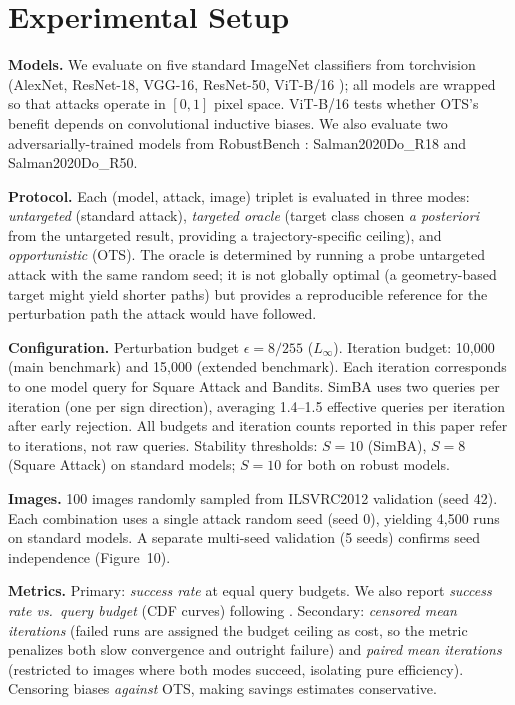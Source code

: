 \documentclass{cap2026}
\begin{document}
\section{Experimental Setup}\label{sec:setup}

\hspace{\parindent}\textbf{Models.} We evaluate on five standard ImageNet classifiers from torchvision (AlexNet, ResNet-18, VGG-16, ResNet-50, ViT-B/16 \citep{dosovitskiy2021image}); all models are wrapped so that attacks operate in $[0, 1]$ pixel space. ViT-B/16 tests whether OTS's benefit depends on convolutional inductive biases. We also evaluate two adversarially-trained models from RobustBench \citep{salman2020adversarially,croce2021robustbench}: Salman2020Do\_R18 and Salman2020Do\_R50.

\textbf{Protocol.} Each (model, attack, image) triplet is evaluated in three modes: \textit{untargeted} (standard attack), \textit{targeted oracle} (target class chosen \textit{a posteriori} from the untargeted result, providing a trajectory-specific ceiling), and \textit{opportunistic} (OTS). The oracle is determined by running a probe untargeted attack with the same random seed; it is not globally optimal (a geometry-based target might yield shorter paths) but provides a reproducible reference for the perturbation path the attack would have followed.

\textbf{Configuration.} Perturbation budget $\epsilon = 8/255$ ($L_\infty$). Iteration budget: 10,000 (main benchmark) and 15,000 (extended benchmark). Each iteration corresponds to one model query for Square Attack and Bandits. SimBA uses two queries per iteration (one per sign direction), averaging 1.4--1.5 effective queries per iteration after early rejection. All budgets and iteration counts reported in this paper refer to iterations, not raw queries. Stability thresholds: $S = 10$ (SimBA), $S = 8$ (Square Attack) on standard models; $S = 10$ for both on robust models.

\textbf{Images.} 100 images randomly sampled from ILSVRC2012 validation (seed 42). Each combination uses a single attack random seed (seed 0), yielding 4,500 runs on standard models. A separate multi-seed validation (5 seeds) confirms seed independence (Figure~10).

\textbf{Metrics.} Primary: \textit{success rate} at equal query budgets. We also report \textit{success rate vs.\ query budget} (CDF curves) following \citet{ughi2021empirical}. Secondary: \textit{censored mean iterations} (failed runs are assigned the budget ceiling as cost, so the metric penalizes both slow convergence and outright failure) and \textit{paired mean iterations} (restricted to images where both modes succeed, isolating pure efficiency). Censoring biases \emph{against} OTS, making savings estimates conservative.
\end{document}
